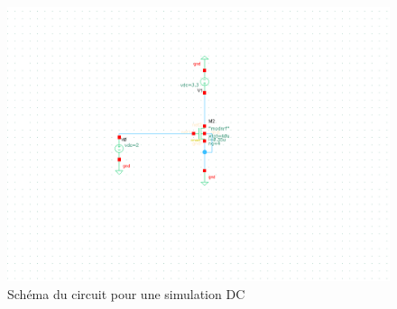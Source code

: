 \documentclass[a4paper]{article}
\begin{document}
\begin{figure}[!htb]
\begin{center}
  \includegraphics[scale=0.40]{arch-transistor.png}
  \caption{Sch\'ema du circuit pour une simulation DC}
\end{center}
\end{figure}

\clearpage
\end{document}
